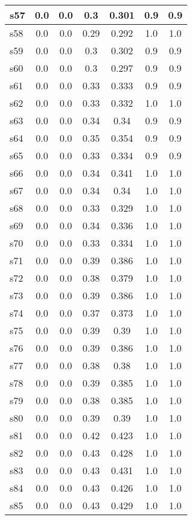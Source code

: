 \documentclass{article}
\begin{document}
\begin{tabular}{|l|c|c|c|c|c|c|}
\hline
s57 &0.0 & 0.0 & 0.3 & 0.301 & 0.9 & 0.9\\
\hline
s58 &0.0 & 0.0 & 0.29 & 0.292 & 1.0 & 1.0\\
\hline
s59 &0.0 & 0.0 & 0.3 & 0.302 & 0.9 & 0.9\\
\hline
s60 &0.0 & 0.0 & 0.3 & 0.297 & 0.9 & 0.9\\
\hline
s61 &0.0 & 0.0 & 0.33 & 0.333 & 0.9 & 0.9\\
\hline
s62 &0.0 & 0.0 & 0.33 & 0.332 & 1.0 & 1.0\\
\hline
s63 &0.0 & 0.0 & 0.34 & 0.34 & 0.9 & 0.9\\
\hline
s64 &0.0 & 0.0 & 0.35 & 0.354 & 0.9 & 0.9\\
\hline
s65 &0.0 & 0.0 & 0.33 & 0.334 & 0.9 & 0.9\\
\hline
s66 &0.0 & 0.0 & 0.34 & 0.341 & 1.0 & 1.0\\
\hline
s67 &0.0 & 0.0 & 0.34 & 0.34 & 1.0 & 1.0\\
\hline
s68 &0.0 & 0.0 & 0.33 & 0.329 & 1.0 & 1.0\\
\hline
s69 &0.0 & 0.0 & 0.34 & 0.336 & 1.0 & 1.0\\
\hline
s70 &0.0 & 0.0 & 0.33 & 0.334 & 1.0 & 1.0\\
\hline
s71 &0.0 & 0.0 & 0.39 & 0.386 & 1.0 & 1.0\\
\hline
s72 &0.0 & 0.0 & 0.38 & 0.379 & 1.0 & 1.0\\
\hline
s73 &0.0 & 0.0 & 0.39 & 0.386 & 1.0 & 1.0\\
\hline
s74 &0.0 & 0.0 & 0.37 & 0.373 & 1.0 & 1.0\\
\hline
s75 &0.0 & 0.0 & 0.39 & 0.39 & 1.0 & 1.0\\
\hline
s76 &0.0 & 0.0 & 0.39 & 0.386 & 1.0 & 1.0\\
\hline
s77 &0.0 & 0.0 & 0.38 & 0.38 & 1.0 & 1.0\\
\hline
s78 &0.0 & 0.0 & 0.39 & 0.385 & 1.0 & 1.0\\
\hline
s79 &0.0 & 0.0 & 0.38 & 0.385 & 1.0 & 1.0\\
\hline
s80 &0.0 & 0.0 & 0.39 & 0.39 & 1.0 & 1.0\\
\hline
s81 &0.0 & 0.0 & 0.42 & 0.423 & 1.0 & 1.0\\
\hline
s82 &0.0 & 0.0 & 0.43 & 0.428 & 1.0 & 1.0\\
\hline
s83 &0.0 & 0.0 & 0.43 & 0.431 & 1.0 & 1.0\\
\hline
s84 &0.0 & 0.0 & 0.43 & 0.426 & 1.0 & 1.0\\
\hline
s85 &0.0 & 0.0 & 0.43 & 0.429 & 1.0 & 1.0\\

\end{tabular}
\end{document}
